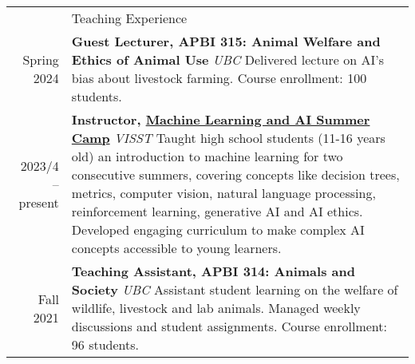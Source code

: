 \documentclass[letterpaper, 11pt]{article}
\newcommand{\headingfont}{\Large\color{OliveGreen}}
\newenvironment{SectionTable}[1]{
	\renewcommand*{\arraystretch}{1.7}
	\setlength{\tabcolsep}{10pt}
	\begin{longtable}{Rp{5.2in}} & #1 \\}
{\end{longtable}\vspace{-.3cm}}
\begin{document}
\begin{SectionTable}{\headingfont Teaching Experience}
Spring 2024 & 
\textbf{Guest Lecturer, APBI 315: Animal Welfare and Ethics of Animal Use} \newline
\textit{UBC} \newline
Delivered lecture on AI's bias about livestock farming. Course enrollment: 100 students. \\
2023/4 -- present &
\textbf{Instructor, \href{https://www.visst.ca/past-camps/machinelearningsummer}{Machine Learning and AI Summer Camp}} \newline
\textit{VISST} \newline
Taught high school students (11-16 years old) an introduction to machine learning for two consecutive summers, covering concepts like decision trees, metrics, computer vision, natural language processing, reinforcement learning, generative AI and AI ethics. Developed engaging curriculum to make complex AI concepts accessible to young learners. \\
Fall 2021 & 
\textbf{Teaching Assistant, APBI 314: Animals and Society} \newline
\textit{UBC} \newline
Assistant student learning on the welfare of wildlife, livestock and lab animals. Managed weekly discussions and student assignments. Course enrollment: 96 students.
\end{SectionTable}
\end{document}
